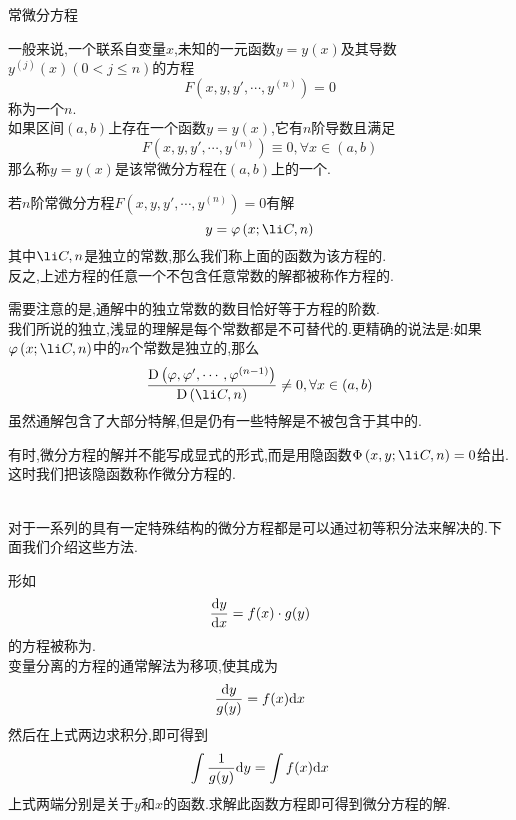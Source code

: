 \documentclass{ctexart}
\begin{document}
\pagestyle{empty}
\begin{center}\large 常微分方程\end{center}
\begin{definition}[1.1 定义:常微分方程]
    一般来说,一个联系自变量$x$,未知的一元函数$y=y(x)$及其导数$y^{(j)}(x)(0<j\leqslant n)$的方程
    \[F\left(x,y,y',\cdots,y^{(n)}\right)=0\]
    称为一个$n$.\\
    如果区间$(a,b)$上存在一个函数$y=y(x)$,它有$n$阶导数且满足
    \[F\left(x,y,y',\cdots,y^{(n)}\right)\equiv0,\forall x\in(a,b)\]
    那么称$y=y(x)$是该常微分方程在$(a,b)$上的一个.
\end{definition}
\begin{definition}[1.2 定义:通解与特解]
    若$n$阶常微分方程$F\left(x,y,y',\cdots,y^{(n)}\right)=0$有解
    \[y=\varphi\left(x;\li C,n\right)\]
    其中$\li C,n$是独立的常数,那么我们称上面的函数为该方程的.\\
    反之,上述方程的任意一个不包含任意常数的解都被称作方程的.
\end{definition}\noindent
需要注意的是,通解中的独立常数的数目恰好等于方程的阶数.\\
我们所说的独立,浅显的理解是每个常数都是不可替代的.更精确的说法是:如果$\varphi\left(x;\li C,n\right)$中的$n$个常数是独立的,那么
\[\dfrac{\text{D}\left(\varphi,\varphi',\cdots,\varphi^{(n-1)}\right)}{\text{D}\left(\li C,n\right)}\neq0,\forall x\in (a,b)\]
虽然通解包含了大部分特解,但是仍有一些特解是不被包含于其中的.
\begin{definition}[1.3 定义:通积分]
    有时,微分方程的解并不能写成显式的形式,而是用隐函数$\Phi\left(x,y;\li C,n\right)=0$给出.这时我们把该隐函数称作微分方程的.
\end{definition}\noindent
{}\\
对于一系列的具有一定特殊结构的微分方程都是可以通过初等积分法来解决的.下面我们介绍这些方法.
\begin{theorem}[2.1 变量分离的方程]
    形如
    \[\dfrac{\mathrm{d} y}{\mathrm{d} x}=f(x)\cdot g(y)\]
    的方程被称为.\\
    变量分离的方程的通常解法为移项,使其成为
    \[\dfrac{\mathrm{d} y}{g(y)}=f(x)\mathrm{d} x\]
    然后在上式两边求积分,即可得到
    \[\int\dfrac{1}{g(y)}\mathrm{d} y=\int{f(x)\mathrm{d}x}\]
    上式两端分别是关于$y$和$x$的函数.求解此函数方程即可得到微分方程的解.
\end{theorem}
\end{document}
